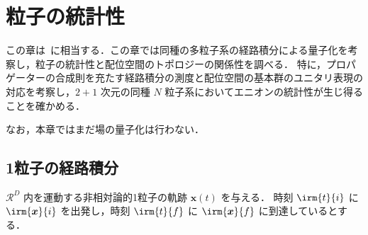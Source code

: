 \documentclass[TQFT_main]{subfiles}
\begin{document}

\chapter{粒子の統計性}

この章は~\cite[Chapter3, 4]{Simon2021}に相当する．この章では同種の多粒子系の経路積分による量子化を考察し，粒子の統計性と配位空間のトポロジーの関係性を調べる．
特に，プロパゲーターの合成則を充たす経路積分の測度と配位空間の基本群のユニタリ表現の対応を考察し，$2+1$ 次元の同種 $N$ 粒子系においてエニオンの統計性が生じ得ることを確かめる．

なお，本章ではまだ場の量子化は行わない．

\section{1粒子の経路積分}

$\mathcal{R}^D$ 内を運動する非相対論的1粒子の軌跡 $\bm{x}(t)$ を与える．
時刻 $\irm{t}{i}$ に $\irm{\bm{x}}{i}$ を出発し，時刻 $\irm{t}{f}$ に $\irm{\bm{x}}{f}$ に到達しているとする．
\end{document}
